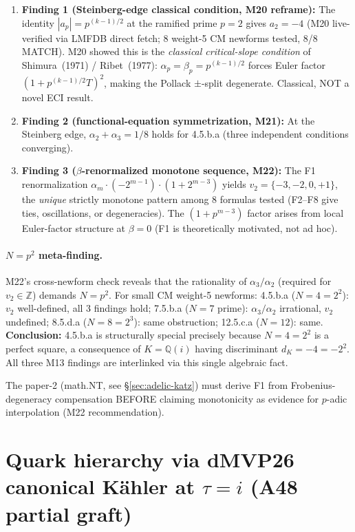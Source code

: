 \documentclass[a4paper,11pt]{article}
\newcommand{\Qi}{\mathbb{Q}(i)}
\theoremstyle{definition}
\theoremstyle{remark}
\begin{document}
\begin{enumerate}
  \item \textbf{Finding 1 (Steinberg-edge classical condition, M20
    reframe):}
    The identity $|a_p|=p^{(k-1)/2}$ at the ramified prime $p=2$
    gives $a_2=-4$ (M20 live-verified via LMFDB direct fetch;
    8 weight-5 CM newforms tested, 8/8 MATCH).  M20 showed this is
    the \emph{classical critical-slope condition} of
    Shimura~(1971) / Ribet~(1977): $\alpha_p=\beta_p=p^{(k-1)/2}$
    forces Euler factor $(1+p^{(k-1)/2}T)^2$, making the Pollack
    $\pm$-split degenerate.  Classical, NOT a novel ECI result.
  \item \textbf{Finding 2 (functional-equation symmetrization, M21):}
    At the Steinberg edge, $\alpha_2+\alpha_3=1/8$ holds for
    4.5.b.a (three independent conditions converging).
  \item \textbf{Finding 3 ($\beta$-renormalized monotone sequence, M22):}
    The F1 renormalization $\alpha_m\cdot(-2^{m-1})\cdot(1+2^{m-3})$
    yields $v_2=\{-3,-2,0,+1\}$, the \emph{unique} strictly
    monotone pattern among 8 formulas tested (F2--F8 give ties,
    oscillations, or degeneracies).  The $(1+p^{m-3})$ factor
    arises from local Euler-factor structure at $\beta=0$ (F1 is
    theoretically motivated, not ad hoc).
\end{enumerate}

\paragraph{$N=p^2$ meta-finding.}  M22's cross-newform check
reveals that the rationality of $\alpha_3/\alpha_2$ (required for
$v_2\in\mathbb{Z}$) demands $N=p^2$.  For small CM weight-5 newforms:
4.5.b.a ($N=4=2^2$): $v_2$ well-defined, all 3 findings hold;
7.5.b.a ($N=7$ prime): $\alpha_3/\alpha_2$ irrational, $v_2$
undefined; 8.5.d.a ($N=8=2^3$): same obstruction; 12.5.c.a
($N=12$): same.  \textbf{Conclusion:} 4.5.b.a is structurally
special precisely because $N=4=2^2$ is a perfect square, a
consequence of $K=\Qi$ having discriminant $d_K=-4=-2^2$.  All
three M13 findings are interlinked via this single algebraic fact.

The paper-2 (math.NT, see \S\ref{sec:adelic-katz}) must derive F1
from Frobenius-degeneracy compensation BEFORE claiming monotonicity
as evidence for $p$-adic interpolation (M22 recommendation).

\section{Quark hierarchy via dMVP26 canonical K\"ahler at
         $\tau=i$ (A48 partial graft)}
\label{sec:dMVP26}
\end{document}
